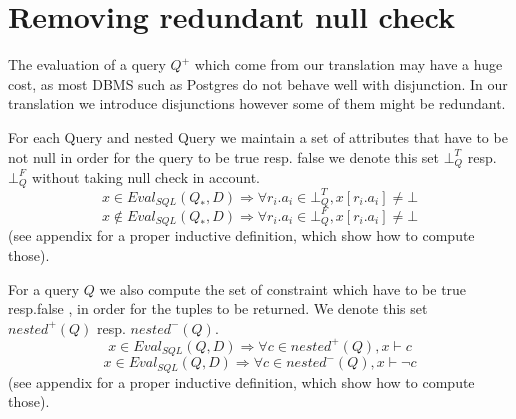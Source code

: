\section{Removing redundant null check}
\label{redun}
The evaluation of a query $Q^+$ which come from our translation may have a huge cost, as most DBMS such as Postgres do not behave well with disjunction. 
In our translation we introduce disjunctions however some of them might be redundant.

\begin{mydef}
For each Query and nested Query we maintain a set of attributes that have to be not null in order for the query to be true resp. false we denote this set $\bot^T_{Q}$ resp.$\bot^F_{Q}$ without taking null check in account.
	$$x \in Eval_{SQL}(Q_*,D)  \Rightarrow \forall r_i.a_i \in \bot^T_Q, x[r_i.a_i] \neq \bot$$
	$$x \notin Eval_{SQL}(Q_*,D)  \Rightarrow \forall r_i.a_i \in \bot^F_Q, x[r_i.a_i] \neq \bot$$
(see appendix for a proper inductive definition, which show how to compute those).
\end{mydef} 

\begin{mydef}
For a query $Q$ we also compute the set of constraint which have to be true resp.false , in order for the tuples to be returned. We denote this set $nested^+(Q)$ resp. $nested^-(Q)$.
	$$x \in Eval_{SQL}(Q,D)  \Rightarrow \forall c \in nested^+(Q), x \vdash c$$
	$$x \in Eval_{SQL}(Q,D)  \Rightarrow \forall c \in nested^-(Q), x \vdash \neg c$$
(see appendix for a proper inductive definition, which show how to compute those).
\end{mydef}


